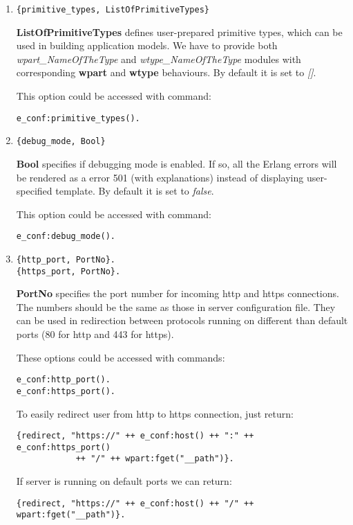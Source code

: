 \begin{enumerate}
This option could be accessed with command: 
\begin{verbatim}
e_conf:host().
\end{verbatim}

\item
\begin{verbatim}
{primitive_types, ListOfPrimitiveTypes}
\end{verbatim}
{\bf ListOfPrimitiveTypes} defines user-prepared primitive types, which can be used in building application models. We have to provide both {\it wpart\_NameOfTheType} and {\it wtype\_NameOfTheType} modules with corresponding {\bf wpart} and {\bf wtype} behaviours. By default it is set to {\it []}.

This option could be accessed with command: 
\begin{verbatim}
e_conf:primitive_types().
\end{verbatim}

\item
\begin{verbatim}
{debug_mode, Bool}
\end{verbatim}
{\bf Bool} specifies if debugging mode is enabled. If so, all the Erlang errors will be rendered as a error 501 (with explanations) instead of displaying user-specified template. By default it is set to {\it false}.

This option could be accessed with command:
\begin{verbatim}
e_conf:debug_mode().
\end{verbatim}

\item
\begin{verbatim}
{http_port, PortNo}.
{https_port, PortNo}.
\end{verbatim}
{\bf PortNo} specifies the port number for incoming http and https connections. The numbers should be the same as those in server configuration file. They can be used in redirection between protocols running on different than default ports (80 for http and 443 for https).

These options could be accessed with commands:
\begin{verbatim}
e_conf:http_port().
e_conf:https_port().
\end{verbatim}

To easily redirect user from http to https connection, just return:
\begin{verbatim}
{redirect, "https://" ++ e_conf:host() ++ ":" ++ e_conf:https_port() 
            ++ "/" ++ wpart:fget("__path")}.
\end{verbatim}
If server is running on default ports we can return:
\begin{verbatim}
{redirect, "https://" ++ e_conf:host() ++ "/" ++ wpart:fget("__path")}.
\end{verbatim}


\end{enumerate}
